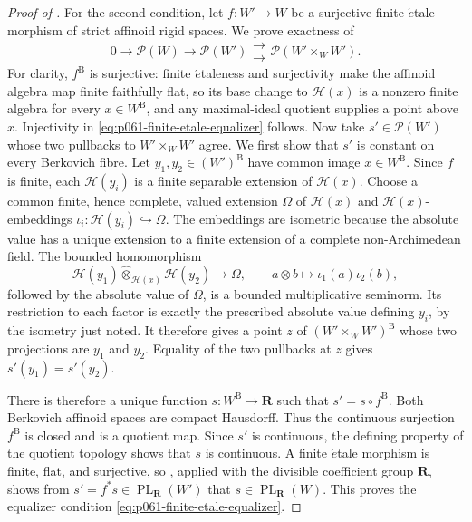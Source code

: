 \begin{proof}[Proof of ]
For the second condition, let \(f:W'\to W\) be a surjective finite
\(\acute{e}\)tale morphism of strict affinoid rigid spaces.  We prove
exactness of
\begin{equation}
\label{eq:p061-finite-etale-equalizer}
  0\longrightarrow\mathscr P(W)\longrightarrow\mathscr P(W')
  \mathrel{\substack{\longrightarrow\\[-0.6ex]\longrightarrow}}
  \mathscr P(W'\times_W W').
\end{equation}
For clarity, \(f^{\mathrm B}\) is surjective: finite
\(\acute{e}\)taleness and surjectivity make the affinoid algebra map finite
faithfully flat, so its base change to \(\mathscr H(x)\) is a nonzero finite
algebra for every \(x\in W^{\mathrm B}\), and any maximal-ideal quotient
supplies a point above \(x\).  Injectivity in
\eqref{eq:p061-finite-etale-equalizer} follows.  Now take
\(s'\in\mathscr P(W')\) whose two pullbacks to \(W'\times_WW'\) agree.
We first show that \(s'\) is constant on every Berkovich fibre.  Let
\(y_1,y_2\in (W')^{\mathrm B}\) have common image
\(x\in W^{\mathrm B}\).  Since \(f\) is finite, each
\(\mathscr H(y_i)\) is a finite separable extension of \(\mathscr H(x)\).
Choose a common finite, hence complete, valued extension \(\Omega\) of
\(\mathscr H(x)\) and \(\mathscr H(x)\)-embeddings
\(\iota_i:\mathscr H(y_i)\hookrightarrow\Omega\).  The embeddings are
isometric because the absolute value has a unique extension to a finite
extension of a complete non-Archimedean field.  The bounded homomorphism
\[
 \mathscr H(y_1)\widehat\otimes_{\mathscr H(x)}\mathscr H(y_2)
 \longrightarrow\Omega,\qquad
 a\otimes b\longmapsto\iota_1(a)\iota_2(b),
\]
followed by the absolute value of \(\Omega\), is a bounded multiplicative
seminorm.  Its restriction to each factor is exactly the prescribed absolute
value defining \(y_i\), by the isometry just noted.  It therefore gives a
point \(z\) of
\((W'\times_WW')^{\mathrm B}\) whose two projections are \(y_1\) and
\(y_2\).  Equality of the two pullbacks at \(z\) gives
\(s'(y_1)=s'(y_2)\).

There is therefore a unique function \(s:W^{\mathrm B}\to\mathbf R\)
such that \(s'=s\circ f^{\mathrm B}\).  Both Berkovich affinoid spaces are
compact Hausdorff.  Thus the continuous surjection \(f^{\mathrm B}\) is
closed and is a quotient map.  Since \(s'\) is continuous, the defining
property of the quotient topology shows that \(s\) is continuous.  A
finite \(\acute{e}\)tale morphism is finite, flat, and surjective, so
\cite[Proposition~5.11]{GJR26}, applied with the divisible coefficient
group \(\mathbf R\), shows from
\(s'=f^*s\in\operatorname{PL}_{\mathbf R}(W')\) that
\(s\in\operatorname{PL}_{\mathbf R}(W)\).  This proves the equalizer
condition \eqref{eq:p061-finite-etale-equalizer}.


\end{proof}
